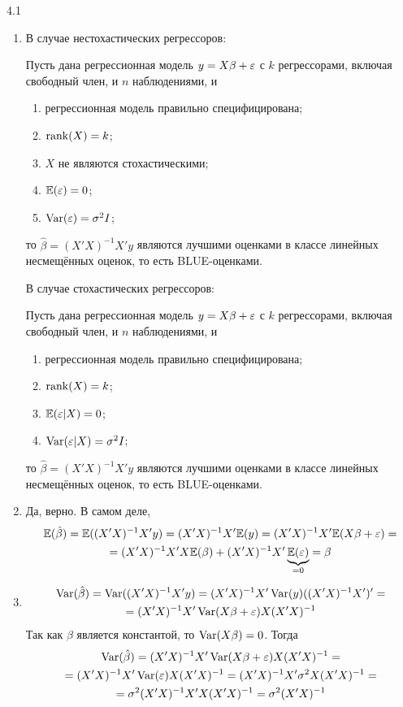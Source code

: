 \protect \hypertarget {soln:4.1}{}
\begin{solution}{{4.1}}
\begin{enumerate}
\item
В случае нестохастических регрессоров:

Пусть дана регрессионная модель $y=X\beta+\varepsilon$ с $k$ регрессорами, включая свободный член, и $n$ наблюдениями, и
\begin{enumerate}
\item регрессионная модель правильно специфицирована;
\item $\operatorname{rank}(X)=k$;
\item $X$ не являются стохастическими;
\item $\mathbb{E}(\varepsilon)=0$;
\item $\operatorname{Var}(\varepsilon)=\sigma^2 I$;
\end{enumerate}
то $\hat\beta=(X'X)^{-1}X'y$ являются лучшими оценками в классе линейных несмещённых оценок, то есть BLUE-оценками.

В случае стохастических регрессоров:

Пусть дана регрессионная модель $y=X\beta+\varepsilon$ с $k$ регрессорами, включая свободный член, и $n$ наблюдениями, и
\begin{enumerate}
\item регрессионная модель правильно специфицирована;
\item $\operatorname{rank}(X)=k$;
\item $\mathbb{E}(\varepsilon|X)=0$;
\item $\operatorname{Var}(\varepsilon|X)=\sigma^2 I$;
\end{enumerate}
то $\hat\beta=(X'X)^{-1}X'y$ являются лучшими оценками в классе линейных несмещённых оценок, то есть BLUE-оценками.

\item
Да, верно. В самом деле,
\begin{multline*}
\mathbb{E}(\hat\beta)=\mathbb{E}((X'X)^{-1}X'y)=(X'X)^{-1}X'\mathbb{E}(y)=(X'X)^{-1}X'\mathbb{E}(X\beta+\varepsilon)=\\
=(X'X)^{-1}X'X\mathbb{E}(\beta)+(X'X)^{-1}X'\underbrace{\mathbb{E}(\varepsilon)}_{=0}=\beta
\end{multline*}


\item
\begin{multline*}
\operatorname{Var}(\hat\beta)=\operatorname{Var}((X'X)^{-1}X'y)=(X'X)^{-1}X'\operatorname{Var}(y)((X'X)^{-1}X')'=\\
=(X'X)^{-1}X'\operatorname{Var}(X\beta+\varepsilon)X(X'X)^{-1}
\end{multline*}
Так как $\beta$ является константой, то $\operatorname{Var}(X\beta)=0$. Тогда
\begin{multline*}
\operatorname{Var}(\hat\beta)=(X'X)^{-1}X'\operatorname{Var}(X\beta+\varepsilon)X(X'X)^{-1}=\\=(X'X)^{-1}X'\operatorname{Var}(\varepsilon)X(X'X)^{-1}=
(X'X)^{-1}X'\sigma^2X(X'X)^{-1}=\\=\sigma^2(X'X)^{-1}X'X(X'X)^{-1}=\sigma^2(X'X)^{-1}
\end{multline*}
\end{enumerate}

\end{solution}

